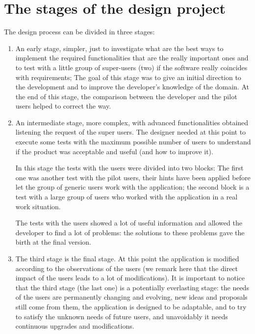 \section{The stages of the design project}

The design process can be divided in three stages:

\begin{enumerate}

\item An early stage, simpler, just to investigate what are the best ways to implement the required functionalities that are the really important ones and to test with a little group of super-users (two) if the software really coincides with requirements; The goal of this stage was to give an initial direction to the development and to improve the developer's knowledge of the domain. At the end of this stage, the comparison between the developer and the pilot users helped to correct the way.

\item An intermediate stage, more complex, with advanced functionalities obtained listening the request of the super users.  
The designer needed at this point to execute some tests with the maximum possible number of users to understand if the product was acceptable and useful (and how to improve it). 

In this stage the tests with the users were divided into two blocks:  
The first one was another test with the pilot users, their hints have been applied before let the group of generic users work with the application;
the second block is a test with a large group of users who worked with the application in a real work situation.

The tests with the users showed a lot of useful information and allowed the developer to find a lot of problems: the solutions to these problems gave the birth at the final version. 

\item
The third stage is the final stage. At this point the application is modified according to the observations of the users (we remark here that the direct impact of the users leads to a lot of modifications). It is important to notice that the third stage (the last one) is a potentially everlasting stage: the needs of the users are permanently changing and evolving, new ideas and proposals still come from them, the application is designed to be adaptable, and to try to satisfy the unknown needs of future users, and unavoidably it needs continuous upgrades and modifications. 

\end{enumerate}



